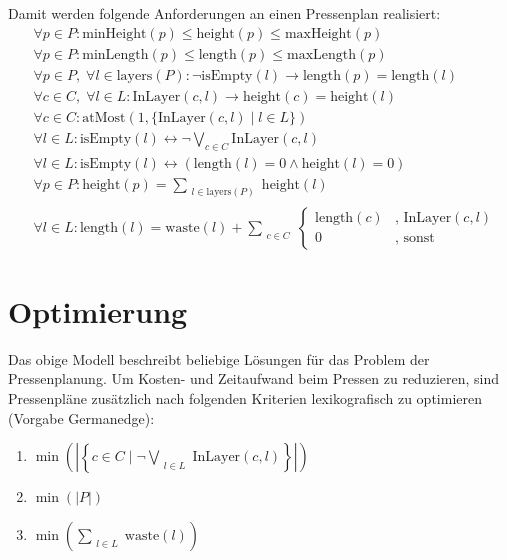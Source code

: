 Damit werden folgende Anforderungen an einen Pressenplan realisiert:
\begin{align}
    & \forall p \in P: \text{minHeight}(p) \leq \text{height}(p) \leq \text{maxHeight}(p) \\[10pt]
    & \forall p \in P: \text{minLength}(p) \leq \text{length}(p) \leq \text{maxLength}(p) \\[10pt]
    & \forall p \in P,\; \forall l \in \text{layers}(P): \neg \text{isEmpty}(l) \rightarrow \text{length}(p) = \text{length}(l) \\[10pt]
    & \forall c \in C,\; \forall l \in L: \text{InLayer}(c,l) \rightarrow \text{height}(c) = \text{height}(l) \\[10pt]
    & \forall c \in C: \text{atMost}(1,\{ \text{InLayer}(c,l) \mid l \in L \}) \\[10pt]
    & \forall l \in L: \text{isEmpty}(l) \leftrightarrow \neg\bigvee_{c \in C} \text{InLayer}(c,l) \\[10pt]
    & \forall l \in L: \text{isEmpty}(l) \leftrightarrow (\text{length}(l) = 0 \land \text{height}(l) = 0) \\[10pt]
    & \forall p \in P: \text{height}(p) = \sum_{\substack{l \in \text{layers}(P)}} \text{height}(l)  \\[10pt]
    & \forall l \in L: \text{length}(l) = \text{waste}(l) + \sum_{\substack{c \in C}}
    \begin{cases}
        \text{length}(c) & \text{, } \text{InLayer}(c,l) \\
        0 & \text{, sonst}
    \end{cases}
\end{align}

\section{Optimierung}
\label{sec:optimierung}
Das obige Modell beschreibt beliebige Lösungen für das Problem der Pressenplanung.
Um Kosten- und Zeitaufwand beim Pressen zu reduzieren, sind Pressenpläne zusätzlich nach folgenden Kriterien lexikografisch zu optimieren (Vorgabe Germanedge):
\begin{enumerate}
    \item $ \min \left( \left\lvert \left\{ c \in C \mid \neg\bigvee\limits_{\substack{l \in L}} \text{InLayer}(c,l) \right\} \right\rvert \right) $
    \item $ \min (\lvert P \rvert) $
    \item $ \min \left(\sum\limits_{\substack{l \in L}} \text{waste}(l) \right) $
\end{enumerate}
